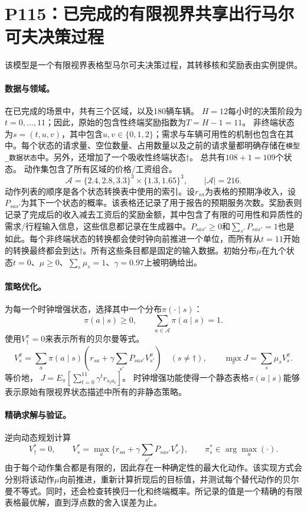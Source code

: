 \documentclass[11pt]{article}
\begin{document}
\section*{P115：已完成的有限视界共享出行马尔可夫决策过程}
该模型是一个有限视界表格型马尔可夫决策过程，其转移核和奖励表由实例提供。 

\paragraph{数据与领域。}
在已完成的场景中，共有三个区域，以及180辆车辆。  
$H=12$每小时的决策阶段为$t=0,\ldots,11$；因此，原始的包含性终端奖励指数为$T=H-1=11$。  
非终端状态为$s=(t,u,v)$，其中包含$u,v\in\{0,1,2\}$；需求与车辆可用性的机制也包含在其中。每个状态的请求量、空位数量、占用数量以及之前的请求量都明确存储在\texttt{模型\_数据状态}中。另外，还增加了一个吸收性终端状态$\dagger$。  
总共有$108+1=109$个状态。  
动作集包含了所有区域的价格/工资组合。
\[
\mathcal A=\{2.4,2.8,3.3\}^{3}\times\{1.3,1.65\}^{3},
\qquad |\mathcal A|=216.
\]
动作列表的顺序是各个状态转换表中使用的索引。设$r_{sa}$为表格的预期净收入，设$P_{sas'}$为其下一个状态的概率。该表格还记录了用于报告的预期服务次数。奖励表则记录了完成后的收入减去工资后的奖励金额，其中包含了有限的可用性和异质性的需求/行程输入信息，这些信息都记录在生成器中。$P_{sas'}\ge0$和$\sum_{s'}P_{sas'}=1$也是如此。每个非终端状态的转换都会使时钟向前推进一个单位，而所有从$t=11$开始的转换最终都会到达$\dagger$。所有这些条目都是固定的输入数据。初始分布$\mu$在九个状态$t=0$、$\mu\ge0$、$\sum_s\mu_s=1$、$\gamma=0.97$上被明确给出。

\paragraph{策略优化。}
为每一个时钟增强状态，选择其中一个分布$\pi(\cdot\mid s)$：
\[
\pi(a\mid s)\ge0,\qquad \sum_{a\in\mathcal A}\pi(a\mid s)=1.
\]
使用$V^\pi_\dagger=0$来表示所有的贝尔曼等式。
\[
V^\pi_s=\sum_a\pi(a\mid s)
 \left(r_{sa}+\gamma\sum_{s'}P_{sas'}V^\pi_{s'}\right)
 \quad(s\ne\dagger),
\qquad
\max_\pi J=\sum_s\mu_sV^\pi_s.
\]
等价地，
$J=E_\pi[\sum_{t=0}^{11}\gamma^t r_{s_ta_t}]$。
时钟增强功能使得一个静态表格$\pi(a\mid s)$能够表示原始有限视界状态描述中所有的非静态策略。

\paragraph{精确求解与验证。}
逆向动态规划计算
\[
V^*_\dagger=0,\qquad
V^*_s=\max_a\{r_{sa}+\gamma\sum_{s'}P_{sas'}V^*_{s'}\},
\qquad \pi^*_s\in\arg\max_a(\cdot).
\]
由于每个动作集合都是有限的，因此存在一种确定性的最大化动作。该实现方式会分别将该动作$\mu$向前推进，重新计算折现后的目标值，并测试每个替代动作的贝尔曼不等式。同时，还会检查转换归一化和终端概率。所记录的值是一个精确的有限表格最优解，直到浮点数的舍入误差为止。
\end{document}
